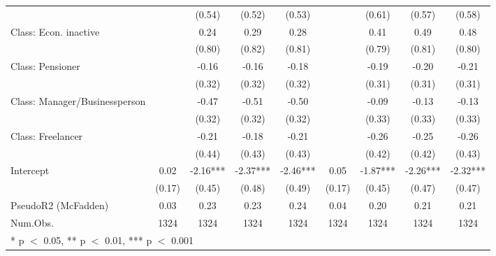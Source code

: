 \begin{table}
\begin{tabular}[t]{lcccccccc}
 &  & (0.54) & (0.52) & (0.53) &  & (0.61) & (0.57) & (0.58)\\
Class: Econ. inactive &  & 0.24 & 0.29 & 0.28 &  & 0.41 & 0.49 & 0.48\\
 &  & (0.80) & (0.82) & (0.81) &  & (0.79) & (0.81) & (0.80)\\
Class: Pensioner &  & -0.16 & -0.16 & -0.18 &  & -0.19 & -0.20 & -0.21\\
 &  & (0.32) & (0.32) & (0.32) &  & (0.31) & (0.31) & (0.31)\\
Class: Manager/Businessperson &  & -0.47 & -0.51 & -0.50 &  & -0.09 & -0.13 & -0.13\\
 &  & (0.32) & (0.32) & (0.32) &  & (0.33) & (0.33) & (0.33)\\
Class: Freelancer &  & -0.21 & -0.18 & -0.21 &  & -0.26 & -0.25 & -0.26\\
 &  & (0.44) & (0.43) & (0.43) &  & (0.42) & (0.42) & (0.43)\\
Intercept & 0.02 & -2.16*** & -2.37*** & -2.46*** & 0.05 & -1.87*** & -2.26*** & -2.32***\\
 & (0.17) & (0.45) & (0.48) & (0.49) & (0.17) & (0.45) & (0.47) & (0.47)\\
\midrule
PseudoR2 (McFadden) & 0.03 & 0.23 & 0.23 & 0.24 & 0.04 & 0.20 & 0.21 & 0.21\\
Num.Obs. & 1324 & 1324 & 1324 & 1324 & 1324 & 1324 & 1324 & 1324\\
\bottomrule
\multicolumn{9}{l}{\rule{0pt}{1em}* p $<$ 0.05, ** p $<$ 0.01, *** p $<$ 0.001}\\
\end{tabular}
\end{table}
